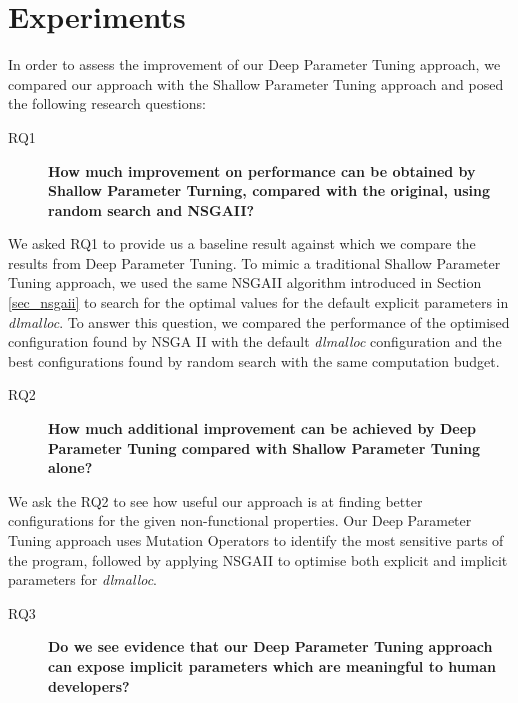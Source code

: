 
\section{Experiments}

In order to assess the improvement of our Deep Parameter Tuning approach, we compared our approach with the Shallow Parameter Tuning approach and posed the following research questions: 
 

\begin{description}
 \item[RQ1] {\bf How much improvement on performance can be obtained by Shallow Parameter Turning, compared with the original, using random search and NSGAII? }
\end{description}

We asked RQ1 to provide us a baseline result against which we compare the results from Deep Parameter Tuning. To mimic a traditional Shallow Parameter Tuning approach, we used the same NSGAII algorithm introduced in Section \ref{sec_nsgaii} to search for the optimal values for the default explicit parameters in \emph{dlmalloc}. To answer this question, we compared the performance of the optimised configuration found by NSGA II with the default \emph{dlmalloc} configuration and the best configurations found by random search with the same computation budget.  

\begin{description}
\item[RQ2] {\bf How much additional improvement can be achieved by Deep Parameter Tuning compared with Shallow Parameter Tuning alone? }
\end{description}

We ask the RQ2 to see how useful our approach is at finding better configurations for the given non-functional properties. Our Deep Parameter Tuning approach uses Mutation Operators to identify the most sensitive parts of the program, followed by applying NSGAII to optimise both explicit and implicit parameters for \emph{dlmalloc}. %

\begin{description}
\item[RQ3] {\bf Do we see evidence that our Deep Parameter Tuning approach can expose implicit parameters which are meaningful to human developers? }
\end{description} 

